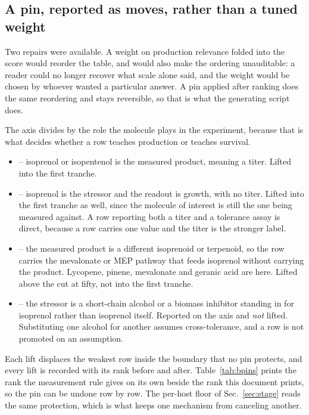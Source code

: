 \subsection{A pin, reported as moves, rather than a tuned weight}

Two repairs were available. A weight on production relevance folded into the score would
reorder the table, and would also make the ordering unauditable: a reader could no longer
recover what scale alone said, and the weight would be chosen by whoever wanted a
particular answer. A pin applied after ranking does the same reordering and stays
reversible, so that is what the generating script does.

The axis divides by the role the molecule plays in the experiment, because that is what
decides whether a row teaches production or teaches survival.

\begin{itemize}[leftmargin=1.2em,itemsep=1pt,topsep=2pt]
  \item {} -- isoprenol or isopentenol is the measured product, meaning a
    titer. Lifted into the first tranche.
  \item {} -- isoprenol is the stressor and the readout is growth, with no
    titer. Lifted into the first tranche as well, since the molecule of interest is still
    the one being measured against. A row reporting both a titer and a tolerance assay is
    direct, because a row carries one value and the titer is the stronger label.
  \item {} -- the measured product is a different isoprenoid or terpenoid,
    so the row carries the mevalonate or MEP pathway that feeds isoprenol without
    carrying the product. Lycopene, pinene, mevalonate and geranic acid are here. Lifted
    above the cut at fifty, not into the first tranche.
  \item {} -- the stressor is a short-chain alcohol or a biomass inhibitor
    standing in for isoprenol rather than isoprenol itself. Reported on the axis and
    \emph{not} lifted. Substituting one alcohol for another assumes cross-tolerance, and
    a row is not promoted on an assumption.
\end{itemize}

Each lift displaces the weakest row inside the boundary that no pin protects, and every
lift is recorded with its rank before and after. Table~\ref{tab:bpins} prints the rank the
measurement rule gives on its own beside the rank this document prints, so the pin can be
undone row by row. The per-host floor of Sec.~\ref{sec:stage} reads the same protection,
which is what keeps one mechanism from canceling another.

